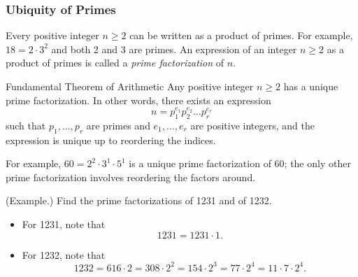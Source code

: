 \documentclass[letterpaper]{article}
\begin{document}
\subsubsection{Ubiquity of Primes}
Every positive integer $n \geq 2$ can be written as a product of primes. For example, $18 = 2 \cdot 3^2$ and both 2 and 3 are primes. An expression of an integer $n \geq 2$ as a product of primes is called a \emph{prime factorization} of $n$.

\begin{theorem}{Fundamental Theorem of Arithmetic}{}
    Any positive integer $n \geq 2$ has a unique prime factorization. In other words, there exists an expression \[n = p_1^{e_1} p_2^{e_2} \hdots p_r^{e_r}\] such that $p_1, \hdots, p_r$ are primes and $e_1, \hdots, e_r$ are positive integers, and the expression is unique up to reordering the indices. 
\end{theorem}
For example, $60 = 2^2 \cdot 3^1 \cdot 5^1$ is a unique prime factorization of 60; the only other prime factorization involves reordering the factors around. 

\begin{mdframed}
    (Example.) Find the prime factorizations of 1231 and of 1232.

    \begin{mdframed}
        \begin{itemize}
            \item For 1231, note that 
            \[1231 = 1231 \cdot 1.\]

            \item For 1232, note that 
            \[1232 = 616 \cdot 2 = 308 \cdot 2^2 = 154 \cdot 2^3 = 77 \cdot 2^4 = 11 \cdot 7 \cdot 2^4.\]
        \end{itemize}
    \end{mdframed}
\end{mdframed}
\end{document}
